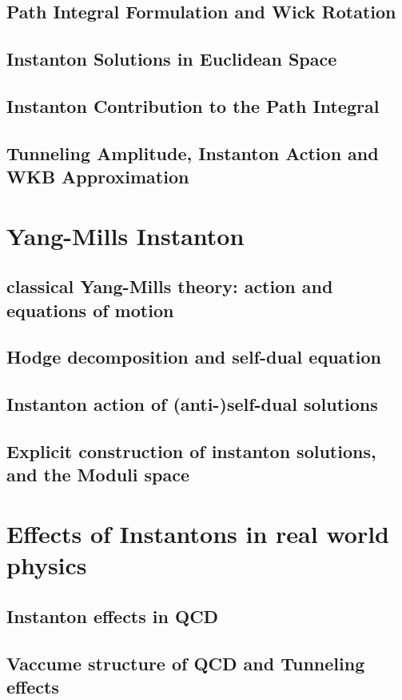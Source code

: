 \documentclass{article}
\begin{document}
\subsection{Path Integral Formulation and Wick Rotation}
\subsection{Instanton Solutions in Euclidean Space}
\subsection{Instanton Contribution to the Path Integral}
\subsection{Tunneling Amplitude, Instanton Action and WKB Approximation}

\section{Yang-Mills Instanton}

\subsection{classical Yang-Mills theory: action and equations of motion}
\subsection{Hodge decomposition and self-dual equation}
\subsection{Instanton action of (anti-)self-dual solutions}
\subsection{Explicit construction of instanton solutions, and the Moduli space}

\section{Effects of Instantons in real world physics}

\subsection{Instanton effects in QCD}
\subsection{Vaccume structure of QCD and Tunneling effects}
\end{document}
